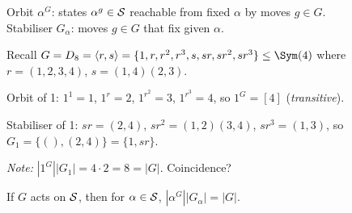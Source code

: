 \begin{slide}
    Orbit $\alpha^G$: states $\alpha^g \in \mathcal{S}$ reachable from fixed $\alpha$ by moves $g \in G$. \\
    Stabiliser $G_\alpha$: moves $g \in G$ that fix given $\alpha$.

    \begin{example}
        \vspace{0pt}
        Recall $G = D_8 = \langle r,s \rangle = \{1,r,r^2,r^3,s,sr,sr^2,sr^3\} \leq \Sym(4)$ where $r = (1,2,3,4)$, $s = (1,4)(2,3)$.

        Orbit of 1: $1^1 = 1$, $1^r = 2$, $1^{r^2} = 3$, $1^{r^3} = 4$, so $1^G = [4]$ (\textit{transitive}). \pause

        Stabiliser of 1: $sr = (2,4)$, $sr^2 = (1,2)(3,4)$, $sr^3 = (1,3)$, so $G_1 = \{(),(2,4)\} = \{1,sr\}$. \pause

        \textit{Note:} $|1^G||G_1| = 4 \cdot 2 = 8 = |G|$. Coincidence?
    \end{example} \pause

    \begin{theorem}
        \vspace{0pt}
        If $G$ acts on $\mathcal{S}$, then for $\alpha \in \mathcal{S}$, $|\alpha^G||G_\alpha| = |G|$.
    \end{theorem}
\end{slide}